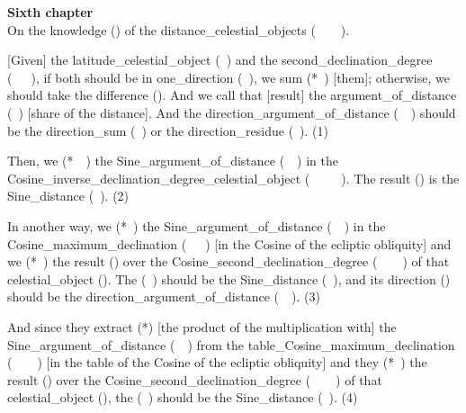 \textbf{Sixth chapter} \\
On the \gls{knowledge} (\marifat) of the \glspl{distance_celestial_object} (\bud\idafaconsonant\ \kawakib\ \az\ \muaddil\ \alnahar).   
\bigskip

[Given] the \gls{latitude_celestial_object} (\ard\idafaconsonant\ \kawkab) and the \gls{second_declination_degree} (\mayl\idafaconsonant\ \thani\idafavowel\ \daraji\idafavowel\ \uy), if both should be in \gls{one_direction} (\yik\ \jahat), we \gls{sum} (*\jam\ \kardan) [them]; otherwise, we should take the \gls{difference} (\tafadul). And we call that [result] the \gls{argument_of_distance} (\hissi\idafavowel\ \bud) [\lit share of the distance]. And the \gls{direction_argument_of_distance} (\jahat\idafaconsonant\ \hissi\idafavowel\ \bud) should be the \gls{direction_sum} (\jahat\idafaconsonant\ \majmu) or the \gls{direction_residue} (\jahat\idafaconsonant\ \fadla). (1)

Then, we  (*\munhatt\idafaconsonant\ \darb\ \kardan) the \gls{Sine_argument_of_distance} (\jayb\idafaconsonant\ \hissi\idafavowel\ \bud) in the \gls{Cosine_inverse_declination_degree_celestial_object} (\jayb\idafaconsonant\ \tamam\idafaconsonant\ \mayl\idafaconsonant\ \mankus\idafaconsonant\ \daraji\idafavowel\ \kawkab). The \gls{result} (\hasil) is the \gls{Sine_distance} (\jayb\idafaconsonant\ \bud). (2)
\bigskip

In another way, we  (*\darb\ \kardan) the \gls{Sine_argument_of_distance} (\jayb\idafaconsonant\ \hissi\idafavowel\ \bud) in the \gls{Cosine_maximum_declination} (\jayb\idafaconsonant\ \tamam\idafaconsonant\ \mayl\idafaconsonant\ \kulli) [\ie  in the Cosine of the ecliptic obliquity] and we  (*\qismat\ \kardan) the \gls{result} (\hasil) over the \gls{Cosine_second_declination_degree} (\jayb\idafaconsonant\ \tamam\idafaconsonant\ \mayl\idafaconsonant\ \thani\idafavowel\ \daraji) of that \gls{celestial_object} (\kawkab). The  (\kharij\idafaconsonant\ \qismat) should be the \gls{Sine_distance} (\jayb\idafaconsonant\ \bud), and its \gls{direction} (\jahat)  should be the \gls{direction_argument_of_distance} (\jahat\idafaconsonant\ \hissi\idafavowel\ \bud). (3)


And since they \gls{extract} (*\darardan) [the product of the multiplication with] the \gls{Sine_argument_of_distance} (\jayb\idafaconsonant\ \hissi\idafavowel\ \bud) from the \gls{table_Cosine_maximum_declination} (\jadval\idafaconsonant\ \jayb\idafaconsonant\ \tamam\idafaconsonant\ \mayl\idafaconsonant\ \kulli) [\ie in the table of the Cosine of the ecliptic obliquity] and they  (*\qismat\ \kardan) the \gls{result} (\hasil) over the \gls{Cosine_second_declination_degree} (\jayb\idafaconsonant\ \tamam\idafaconsonant\ \mayl\idafaconsonant\ \thani\idafavowel\ \daraji) of that \gls{celestial_object} (\kawkab), the  (\kharij\idafaconsonant\ \qismat) should be the \gls{Sine_distance} (\jayb\idafaconsonant\ \bud). (4)

